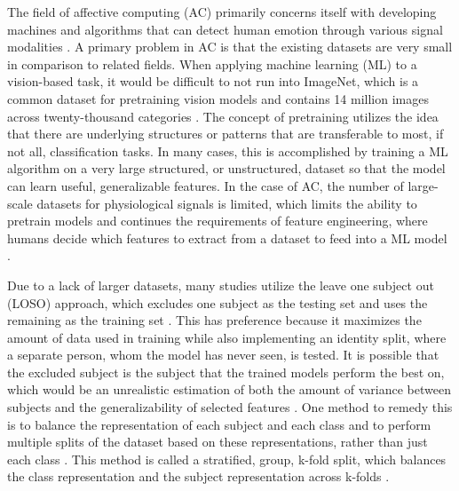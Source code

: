 \documentclass[12pt]{iopart}
\begin{document}
The field of affective computing (AC) primarily concerns itself with developing machines and algorithms that can detect human emotion through various signal modalities \cite{picard2000affective}.  A primary problem in AC is that the existing datasets are very small in comparison to related fields. When applying machine learning (ML) to a vision-based task, it would be difficult to not run into ImageNet, which is a common dataset for pretraining vision models and contains 14 million images across twenty-thousand categories \cite{deng2009imagenet}.  The concept of pretraining utilizes the idea that there are underlying structures or patterns that are transferable to most, if not all, classification tasks.  In many cases, this is accomplished by training a ML algorithm on a very large structured, or unstructured, dataset so that the model can learn useful, generalizable features.  In the case of AC, the number of large-scale datasets for physiological signals is limited, which limits the ability to pretrain models and continues the requirements of feature engineering, where humans decide which features to extract from a dataset to feed into a ML model \cite{picard2000affective, spathis2020learning, schmidt2018introducing, goodwin2019predicting, thayer2022effects}.  

Due to a lack of larger datasets, many studies utilize the leave one subject out (LOSO) approach, which excludes one subject as the testing set and uses the remaining as the training set \cite{schmidt2018introducing, farrahi2019evaluating}.  This has preference because it maximizes the amount of data used in training while also implementing an identity split, where a separate person, whom the model has never seen, is tested. It is possible that the excluded subject is the subject that the trained models perform the best on, which would be an unrealistic estimation of both the amount of variance between subjects and the generalizability of selected features \cite{mac2002problem, li2006reduction}.  One method to remedy this is to balance the representation of each subject and each class and to perform multiple splits of the dataset based on these representations, rather than just each class \cite{li2006reduction}.  This method is called a stratified, group, k-fold split, which balances the class representation and the subject representation across k-folds \cite{pedregosa2011scikit}.  
\end{document}
